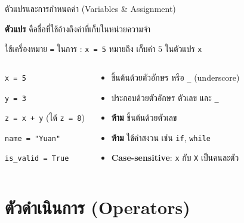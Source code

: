 \documentclass[11pt, aspectratio=169]{beamer}
\newcommand{\py}[1]{\texttt{#1}}
\begin{document}
\begin{frame}{ตัวแปรและการกำหนดค่า (Variables \& Assignment)}
  \begin{explanation}[การกำหนดค่า]
    \textbf{ตัวแปร} คือชื่อที่ใช้อ้างถึงค่าที่เก็บในหน่วยความจำ

    ใช้เครื่องหมาย \py{=} ในการ : \py{x = 5} หมายถึง เก็บค่า $5$ ในตัวแปร \py{x}
  \end{explanation}
  \begin{columns}[T]
      \begin{exambox}
        \py{x = 5}

        \py{y = 3}

        \py{z = x + y} \qquad (ได้ \py{z = 8})

        \py{name = "Yuan"}

        \py{is\_valid = True}
      \end{exambox}
      \begin{explanation}
        \begin{itemize}
          \item ขึ้นต้นด้วยตัวอักษร หรือ \texttt{\_} (underscore)
          \item ประกอบด้วยตัวอักษร ตัวเลข และ \texttt{\_}
          \item \textbf{ห้าม} ขึ้นต้นด้วยตัวเลข
          \item \textbf{ห้าม} ใช้คำสงวน เช่น \py{if}, \py{while}
          \item \textbf{Case-sensitive}: \py{x} กับ \py{X} เป็นคนละตัว
        \end{itemize}
      \end{explanation}
  \end{columns}
\end{frame}

\section{ตัวดำเนินการ (Operators)}
\end{document}
